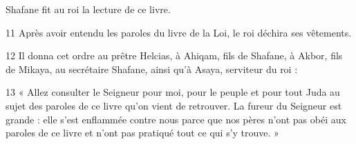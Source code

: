 Shafane fit au roi la lecture de ce livre.

11 Après avoir entendu les paroles du livre de la Loi, le roi déchira ses vêtements.

12 Il donna cet ordre au prêtre Helcias, à Ahiqam, fils de Shafane, à Akbor, fils de Mikaya, au secrétaire Shafane, ainsi qu’à Asaya, serviteur du roi :

13 « Allez consulter le Seigneur pour moi, pour le peuple et pour tout Juda au sujet des paroles de ce livre qu’on vient de retrouver. La fureur du Seigneur est grande : elle s’est enflammée contre nous parce que nos pères n’ont pas obéi aux paroles de ce livre et n’ont pas pratiqué tout ce qui s’y trouve. »